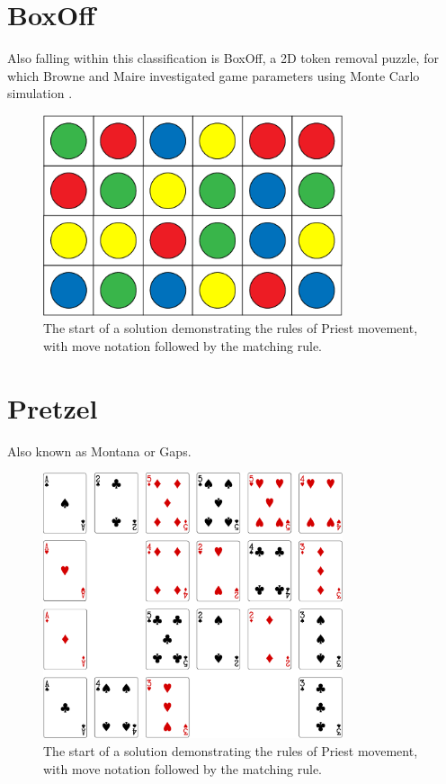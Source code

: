 \documentclass[journal]{IEEEtran}
\begin{document}



\section{BoxOff}
Also falling within this classification is BoxOff, a 2D token removal puzzle, for which Browne and Maire investigated game parameters using Monte Carlo simulation \cite{MCPUZZLE}.

\begin{figure}[t]
\centering
\includegraphics[width=8.8cm]{boxoff4x6.png}
\caption{The start of a solution demonstrating the rules of Priest movement, with move notation followed by the matching rule. }
\label{fig:priestrules}
\end{figure}


\section{Pretzel}
Also known as Montana or Gaps.

\begin{figure}[t]
\centering
\includegraphics[width=8.8cm]{pretzel.png}
\caption{The start of a solution demonstrating the rules of Priest movement, with move notation followed by the matching rule. }
\label{fig:priestrules}
\end{figure}
\end{document}
